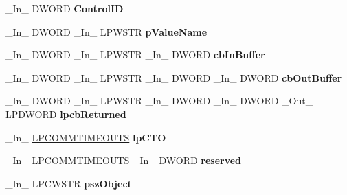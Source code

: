 \begin{DoxyCompactItemize}
\mbox{\label{struct___m_o_n_i_t_o_r2_acba2191060c588137e8aa17af3a4e904}} 
\+\_\+\+In\+\_\+ D\+W\+O\+RD {\bfseries Control\+ID}
\item 
\mbox{\label{struct___m_o_n_i_t_o_r2_ad2033968da4a7d7b41058c765cf943c8}} 
\+\_\+\+In\+\_\+ D\+W\+O\+RD \+\_\+\+In\+\_\+ L\+P\+W\+S\+TR {\bfseries p\+Value\+Name}
\item 
\mbox{\label{struct___m_o_n_i_t_o_r2_a3115fb9c2ec56879de27de8ef3e65223}} 
\+\_\+\+In\+\_\+ D\+W\+O\+RD \+\_\+\+In\+\_\+ L\+P\+W\+S\+TR \+\_\+\+In\+\_\+ D\+W\+O\+RD {\bfseries cb\+In\+Buffer}
\item 
\mbox{\label{struct___m_o_n_i_t_o_r2_ac0a5eb6be12b23ea3f81a27b5581120b}} 
\+\_\+\+In\+\_\+ D\+W\+O\+RD \+\_\+\+In\+\_\+ L\+P\+W\+S\+TR \+\_\+\+In\+\_\+ D\+W\+O\+RD \+\_\+\+In\+\_\+ D\+W\+O\+RD {\bfseries cb\+Out\+Buffer}
\item 
\mbox{\label{struct___m_o_n_i_t_o_r2_a655b1106f8e2344a068b2b84806b5cf9}} 
\+\_\+\+In\+\_\+ D\+W\+O\+RD \+\_\+\+In\+\_\+ L\+P\+W\+S\+TR \+\_\+\+In\+\_\+ D\+W\+O\+RD \+\_\+\+In\+\_\+ D\+W\+O\+RD \+\_\+\+Out\+\_\+ L\+P\+D\+W\+O\+RD {\bfseries lpcb\+Returned}
\item 
\mbox{\label{struct___m_o_n_i_t_o_r2_a6643cff7fa15181012f51febc153a518}} 
\+\_\+\+In\+\_\+ \hyperlink{struct___c_o_m_m_t_i_m_e_o_u_t_s}{L\+P\+C\+O\+M\+M\+T\+I\+M\+E\+O\+U\+TS} {\bfseries lp\+C\+TO}
\item 
\mbox{\label{struct___m_o_n_i_t_o_r2_ae349f1dfbbceb52686285128e4708405}} 
\+\_\+\+In\+\_\+ \hyperlink{struct___c_o_m_m_t_i_m_e_o_u_t_s}{L\+P\+C\+O\+M\+M\+T\+I\+M\+E\+O\+U\+TS} \+\_\+\+In\+\_\+ D\+W\+O\+RD {\bfseries reserved}
\item 
\mbox{\label{struct___m_o_n_i_t_o_r2_a9019031db5499cc0748d735c96ca6016}} 
\+\_\+\+In\+\_\+ L\+P\+C\+W\+S\+TR {\bfseries psz\+Object}
\item 
\mbox{\label{struct___m_o_n_i_t_o_r2_aca5a2655518fdf0c75717ee51b0066e1}} 

\end{DoxyCompactItemize}
